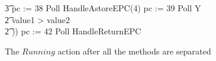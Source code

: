 \begin{figure}[t!]
\begin{circus}
    \t3 pc := 38 \circseq Poll \circseq HandleAstoreEPC(4) \circseq pc := 39 \circseq Poll \circseq Y \\
    \t2 {} \circelse value1 > value2 \circthen \Skip \\
    \t2 \circfi)) \circseq pc := 42 \circseq Poll \circseq HandleReturnEPC
  \end{circus}
  \caption{The $Running$ action after all the methods are separated}
  \label{final-method-separation-example-figure}
\end{figure}
  
